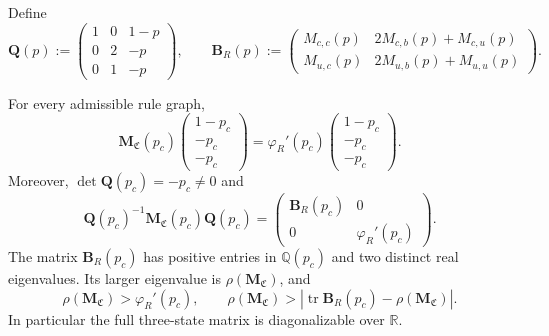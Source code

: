 Define
\[
 \mathbf Q(p):=
 \begin{pmatrix}
  1&0&1-p\\
  0&2&-p\\
  0&1&-p
 \end{pmatrix},
 \qquad
 \mathbf B_R(p):=
 \begin{pmatrix}
 M_{c,c}(p)&2M_{c,b}(p)+M_{c,u}(p)\\
 M_{u,c}(p)&2M_{u,b}(p)+M_{u,u}(p)
 \end{pmatrix}.
\]

\begin{theorem}\label{thm:three-state-block}
For every admissible rule graph,
\[
 \mathbf M_{\mathfrak C}(p_c)
 \begin{pmatrix}1-p_c\\-p_c\\-p_c\end{pmatrix}
 =\varphi_R'(p_c)
 \begin{pmatrix}1-p_c\\-p_c\\-p_c\end{pmatrix}.
\]
Moreover, $\det\mathbf Q(p_c)=-p_c\ne0$ and
\[
 \mathbf Q(p_c)^{-1}\mathbf M_{\mathfrak C}(p_c)\mathbf Q(p_c)
 =\begin{pmatrix}
   \mathbf B_R(p_c)&0\\
   0&\varphi_R'(p_c)
  \end{pmatrix}.
\]
The matrix $\mathbf B_R(p_c)$ has positive entries in $\mathbb Q(p_c)$ and two distinct real eigenvalues.
Its larger eigenvalue is $\rho(\mathbf M_{\mathfrak C})$, and
\[
 \rho(\mathbf M_{\mathfrak C})>\varphi_R'(p_c),
 \qquad
 \rho(\mathbf M_{\mathfrak C})>\left|\operatorname{tr}\mathbf B_R(p_c)-\rho(\mathbf M_{\mathfrak C})\right|.
\]
In particular the full three-state matrix is diagonalizable over $\mathbb R$.
\end{theorem}


